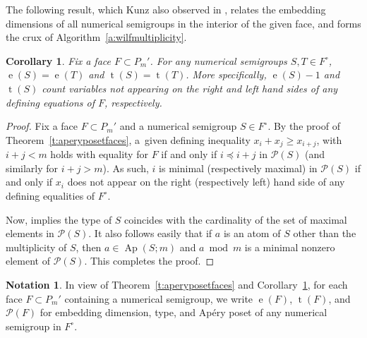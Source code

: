 \documentclass[12pt]{amsart}
\newtheorem{cor}[thm]{Corollary}
\theoremstyle{definition}
\newtheorem{notation}[thm]{Notation}
\numberwithin{equation}{section}
\renewcommand\>{\rangle}
\newcommand\<{\langle}
\newcommand\0{\mathbf{0}}
\DeclareMathOperator\Ap{Ap} %
\begin{document}
The following result, which Kunz also observed in \cite[Section~2]{kunz}, relates the embedding dimensions of all numerical semigroups in the interior of the given face, and forms the crux of Algorithm~\ref{a:wilfmultiplicity}.  

\begin{cor}\label{c:withinfaces}
Fix a face $F \subset P_m'$.  
For any numerical semigroups $S, T \in F^\circ$, $\operatorname{e}(S) = \operatorname{e}(T)$ and $\operatorname{t}(S) = \operatorname{t}(T)$.  More specifically, $\operatorname{e}(S) - 1$ and $\operatorname{t}(S)$ count variables not appearing on the right and left hand sides of any defining equations of $F$, respectively.  
\end{cor}

\begin{proof}
Fix a face $F \subset P_m'$ and a numerical semigroup $S \in F^\circ$.  By the proof of Theorem~\ref{t:aperyposetfaces}, a~given defining inequality $x_i + x_j \ge x_{i + j}$, with $i+j<m$ holds with equality for $F$ if and only if $i \preceq i + j$ in $\mathcal P(S)$ (and similarly for $i + j > m$).  As such, $i$ is minimal (respectively maximal) in $\mathcal P(S)$ if and only if $x_i$ does not appear on the right (respectively left) hand side of any defining equalities of $F^\circ$.  

Now, \cite[Proposition 2.20]{numerical} implies the type of $S$ coincides with the cardinality of the set of maximal elements in $\mathcal{P}(S)$. It also follows easily that if $a$ is an atom of $S$ other than the multiplicity of $S$, then $a\in\Ap(S;m)$ and $a \bmod m$ is a minimal nonzero element of $\mathcal{P}(S)$.  This completes the proof.  
\end{proof}

\begin{notation}\label{n:withinfaces}
In view of Theorem~\ref{t:aperyposetfaces} and Corollary~\ref{c:withinfaces}, for each face $F \subset P_m'$ containing a numerical semigroup, we write $\operatorname e(F)$, $\operatorname t(F)$, and $\mathcal P(F)$ for embedding dimension, type, and Ap\'ery poset of any numerical semigroup in $F^\circ$.  
\end{notation}
\end{document}
